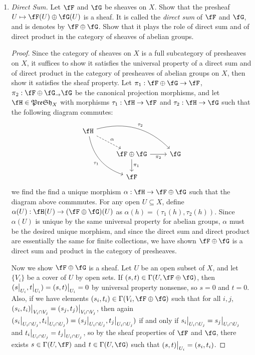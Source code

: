 \documentclass[a4paper]{article}
\begin{document}
\begin{enumerate} [label=\textbf{\arabic*.}, leftmargin=0em]
    \item[\textbf{9.}] \textit{Direct Sum.} Let $\fF$ and $\fG$ be sheaves on $X$. Show that the presheaf $U \mapsto \fF(U) \oplus \fG(U)$ is a sheaf. It is called the \textit{direct sum} of $\fF$ and $\fG$, and is denotes by $\fF \oplus \fG$. Show that it plays the role of direct sum and of direct product in the category of sheaves of abelian groups.

          \begin{proof}
              Since the category of sheaves on $X$ is a full subcategory of presheaves on $X$, it suffices to show it satisfies the universal property of a direct sum and of direct product in the category of presheaves of abelian groups on $X$, then show it satisfies the sheaf property. Let $\pi_1 : \fF \oplus \fG \to \fF$, $\pi_2 : \fF \oplus \fG_ \to \fG$ be the canonical projection morphisms, and let $\fH \in \mathfrak{PreSh}_X$ with morphisms $\tau_1 : \fH \to \fF$ and $\tau_2 : \fH \to \fG$ such that the following diagram commutes:
              \[ \begin{tikzcd}
                      \fH \arrow[rrd, "\tau_2", bend left] \arrow[rdd, "\tau_1"', bend right] \arrow[rd, "\alpha", dashed] &                                                                       &             \\
                      & \fF \oplus \fG \arrow[d, "\pi_1"] \arrow[r, "\pi_2"'] & \fG \\
                      & \fF                                                           &
                  \end{tikzcd} \]
              we find the find a unique morphism $\alpha : \fH \to \fF \oplus \fG$ such that the diagram above commmutes. For any open $U \subseteq X$, define $\alpha(U) : \fH(U) \to (\fF \oplus \fG)(U)$ as $\alpha(h) = (\tau_1(h), \tau_2(h))$. Since $\alpha(U)$ is unique by the same universal property for abelian groups, $\alpha$ must be the desired unique morphism, and since the direct sum and direct product are essentially the same for finite collections, we have shown $\fF \oplus \fG$ is a direct sum and product in the category of presheaves.

              Now we show $\fF \oplus \fG$ is a sheaf. Let $U$ be an open subset of $X$, and let $\{ V_i \}$ be a cover of $U$ by open sets. If $(s, t) \in \Gamma(U, \fF \oplus \fG)$, then $(\restr{s}{U_i}, \restr{t}{U_i}) = \restr{(s, t)}{U_i} = 0$ by universal property nonsense, so $s = 0$ and $t = 0$. Also, if we have elements $(s_i, t_i) \in \Gamma(V_i, \fF \oplus \fG)$ such that for all $i, j$, $\restr{(s_i, t_i)}{V_i \cap V_j} = \restr{(s_j, t_j)}{V_i \cap V_j}$, then again $(\restr{s_i}{U_i \cap U_j}, \restr{t_i}{U_i \cap U_j}) =(\restr{s_j}{U_i \cap U_j}, \restr{t_j}{U_i \cap U_j})$ if and only if $\restr{s_i}{U_i \cap U_j} = \restr{s_j}{U_i \cap U_j}$ and $\restr{t_i}{U_i \cap U_j} = \restr{t_j}{U_i \cap U_j}$, so by the sheaf properties of $\fF$ and $\fG$, there exists $s \in \Gamma(U, \fF)$ and $t \in \Gamma(U, \fG)$ such that $\restr{(s, t)}{U_i} = (s_i, t_i)$.
          \end{proof}


\end{enumerate}
\end{document}

